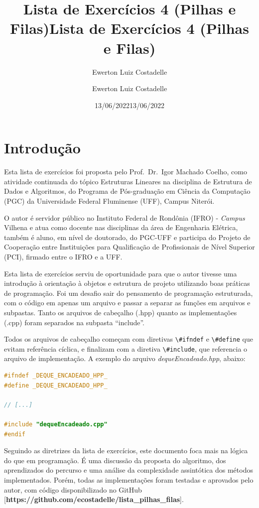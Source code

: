 \documentclass[
  brazilian,
  paper=a4,
  oneside  ,captions=tableheading
]{scrbook}
\title{Lista de Exercícios 4 (Pilhas e Filas)}
\author{Ewerton Luiz Costadelle}
\date{13/06/2022}
\title{Lista de Exercícios 4 (Pilhas e Filas)}
\author{Ewerton Luiz Costadelle}
\date{13/06/2022}
\newcommand{\passthrough}[1]{#1}
\begin{document}


\frontmatter


{
\setcounter{tocdepth}{2}
\tableofcontents
\newpage
}
\mainmatter
\hypertarget{introduuxe7uxe3o}{%
\chapter{Introdução}\label{introduuxe7uxe3o}}

Esta lista de exercícios foi proposta pelo Prof.~Dr.~Igor Machado
Coelho, como atividade continuada do tópico Estruturas Lineares na
disciplina de Estrutura de Dados e Algoritmos, do Programa de
Pós-graduação em Ciência da Computação (PGC) da Universidade Federal
Fluminense (UFF), Campus Niterói.

O autor é servidor público no Instituto Federal de Rondônia (IFRO) -
\emph{Campus} Vilhena e atua como docente nas disciplinas da área de
Engenharia Elétrica, também é aluno, em nível de doutorado, do PGC-UFF e
participa do Projeto de Cooperação entre Instituições para Qualificação
de Profissionais de Nível Superior (PCI), firmado entre o IFRO e a UFF.

Esta lista de exercícios serviu de oportunidade para que o autor tivesse
uma introdução à orientação à objetos e estrutura de projeto utilizando
boas práticas de programação. Foi um desafio sair do pensamento de
programação estruturada, com o código em apenas um arquivo e passar a
separar as funções em arquivos e subpastas. Tanto os arquivos de
cabeçalho (.hpp) quanto as implementações (.cpp) foram separados na
subpasta ``include''.

Todos os arquivos de cabeçalho começam com diretivas
\passthrough{\lstinline!\#ifndef!} e \passthrough{\lstinline!\#define!}
que evitam referência cíclica, e finalizam com a diretiva
\passthrough{\lstinline!\#include!}, que referencia o arquivo de
implementação. A exemplo do arquivo \emph{dequeEncadeado.hpp}, abaixo:

\begin{lstlisting}[language={C++}]
#ifndef _DEQUE_ENCADEADO_HPP_
#define _DEQUE_ENCADEADO_HPP_

// [...]

#include "dequeEncadeado.cpp"
#endif
\end{lstlisting}

Seguindo as diretrizes da lista de exercícios, este documento foca mais
na lógica do que em programação. É uma discussão da proposta do
algoritmo, dos aprendizados do percurso e uma análise da complexidade
assintótica dos métodos implementados. Porém, todas as implementações
foram testadas e aprovados pelo autor, com código disponibilizado no
GitHub
{[}\textbf{https://github.com/ecostadelle/lista\_pilhas\_filas}{]}.
\end{document}
